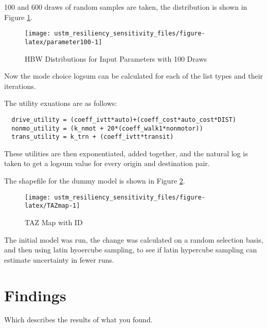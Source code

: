 \documentclass[3p, authoryear, review]{elsarticle} %
\begin{document}
100 and 600 draws of random samples are taken, the distribution is shown in Figure \ref{fig:parameter100}.

\begin{figure}

{\centering \texttt{[image: ustm\_resiliency\_sensitivity\_files/figure-latex/parameter100-1]} 

}

\caption{HBW Distributions for Input Parameters with 100 Draws}\label{fig:parameter100}
\end{figure}

Now the mode choice logsum can be calculated for each of the list types and their iterations.

The utility exuations are as follows:

\begin{verbatim}
  drive_utility = (coeff_ivtt*auto)+(coeff_cost*auto_cost*DIST)
  nonmo_utility = (k_nmot + 20*(coeff_walk1*nonmotor))
  trans_utility = k_trn + (coeff_ivtt*transit) 
\end{verbatim}

These utilities are then exponentiated, added together, and the natural log is taken to get a logsum value for every origin and destination pair.

The shapefile for the dummy model is shown in Figure \ref{fig:TAZmap}.

\begin{figure}

{\centering \texttt{[image: ustm\_resiliency\_sensitivity\_files/figure-latex/TAZmap-1]} 

}

\caption{TAZ Map with ID}\label{fig:TAZmap}
\end{figure}

The initial model was run, the change was calculated on a random selection basis, and then using latin hyoercube sampling, to see if latin hypercube sampling can estimate uncertainty in fewer runs.

\hypertarget{findings}{%
\section{Findings}\label{findings}}

Which describes the results of what you found.


\end{document}
